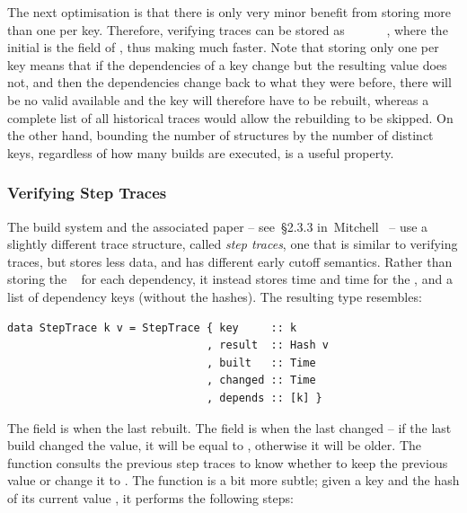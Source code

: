 The next optimisation is that there is only very minor benefit from storing more
than one  per key. Therefore, verifying traces can be stored as
~~~~~~, where the
initial  is the  field of , thus making 
much faster. Note that storing only one  per key means that if the
dependencies of a key change but the resulting value does not, and then the
dependencies change back to what they were before, there will be no valid
 available and the key will therefore have to be rebuilt, whereas a
complete list of all historical traces would allow the rebuilding to be skipped.
On the other hand, bounding the number of  structures by the number of
distinct keys, regardless of how many builds are executed, is a useful property.

\subsubsection{Verifying Step Traces}\label{sec-step-traces}

The \Shake build system and the associated paper -- see~\S2.3.3
in~Mitchell~ -- use a slightly different trace
structure, called \emph{step traces}, one that is similar to verifying traces,
but stores less data, and has different early cutoff semantics. Rather than
storing the ~ for each dependency, it instead stores 
time and  time for the , and a list of dependency keys
(without the hashes). The resulting  type resembles:

\vspace{1mm}
\begin{verbatim}
data StepTrace k v = StepTrace { key     :: k
                               , result  :: Hash v
                               , built   :: Time
                               , changed :: Time
                               , depends :: [k] }
\end{verbatim}
\vspace{1mm}

\noindent
The  field is when the  last rebuilt. The  field
is when the  last changed -- if the last build changed the value, it
will be equal to , otherwise it will be older. The function
 consults the previous step traces to know whether to keep the
previous  value or change it to . The function
 is a bit more subtle; given a key  and the hash of its
current value , it performs the following steps:

